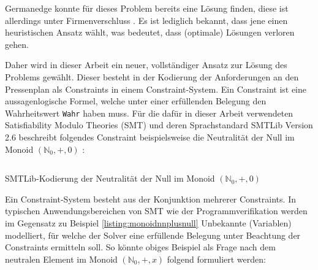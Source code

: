 Germanedge konnte für dieses Problem bereits eine Lösung finden, diese ist allerdings unter Firmenverschluss .
Es ist lediglich bekannt, dass jene einen heuristischen Ansatz wählt, was bedeutet, dass (optimale) Lösungen verloren gehen.

Daher wird in dieser Arbeit ein neuer, vollständiger Ansatz zur Lösung des Problems gewählt. 
Dieser besteht in der Kodierung der Anforderungen an den Pressenplan als Constraints in einem Constraint-System.
Ein Constraint ist eine aussagenlogische Formel, welche unter einer erfüllenden Belegung den Wahrheitswert \texttt{Wahr} haben muss.
Für die dafür in dieser Arbeit verwendeten Satisfiability Modulo Theories (SMT) und deren Sprachstandard SMTLib Version 2.6 \cite{smtlib}
beschreibt folgendes Constraint beispielsweise die Neutralität der Null im Monoid $(\mathbb{N}_0, +, 0)$ :

\begin{listing}[H]
    \inputminted[linenos=true]{haskell}{Code/Einleitung/MonoidNPlusNull.smt2}
    \caption{SMTLib-Kodierung der Neutralität der Null im Monoid $(\mathbb{N}_0, +, 0)$}
    \label{listing:monoidnnplusnull}
\end{listing}

Ein Constraint-System besteht aus der Konjunktion mehrerer Constraints.
In typischen Anwendungsbereichen von SMT wie der Programmverifikation \cite{smt} werden im Gegensatz zu Beispiel \ref{listing:monoidnnplusnull}
Unbekannte (Variablen) modelliert, für welche der Solver eine erfüllende Belegung unter Beachtung der Constraints ermitteln soll.
So könnte obiges Beispiel als Frage nach dem neutralen Element im Monoid $(\mathbb{N}_0, +, x)$ folgend formuliert werden:

